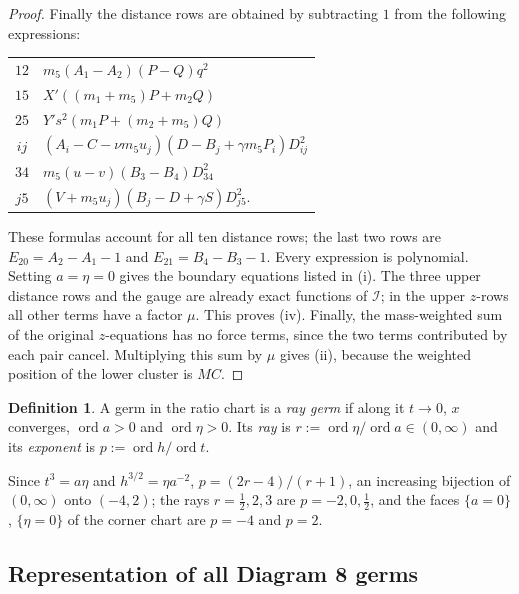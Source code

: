 \documentclass[11pt]{amsart}
\theoremstyle{definition}
\newtheorem{definition}[theorem]{Definition}
\theoremstyle{remark}
\newcommand{\ord}{\operatorname{ord}}
\begin{document}
{\begin{proof}
Finally the distance rows are obtained by subtracting $1$ from the
following expressions:
\begin{center}
\begin{tabular}{c l}
$12$ & $m_5(A_1-A_2)(P-Q)q^2$\\
$15$ & $X'((m_1+m_5)P+m_2Q)$\\
$25$ & $Y's^2(m_1P+(m_2+m_5)Q)$\\
$ij$ & $(A_i-C-\nu m_5u_j)(D-B_j+\gamma m_5P_i)D_{ij}^2$\\
$34$ & $m_5(u-v)(B_3-B_4)D_{34}^2$\\
$j5$ & $(V+m_5u_j)(B_j-D+\gamma S)D_{j5}^2$.
\end{tabular}
\end{center}
These formulas account for all ten distance rows; the last two rows are
$E_{20}=A_2-A_1-1$ and $E_{21}=B_4-B_3-1$.
Every expression is polynomial.  Setting $a=\eta=0$ gives the boundary
equations listed in (i).
The three upper distance rows and the gauge are already exact functions
of $\mathcal I$; in the upper $z$-rows all other terms have a factor $\mu$.
This proves (iv).  Finally, the mass-weighted sum of the original $z$-equations
has no force terms, since the two terms contributed by each pair cancel.
Multiplying this sum by $\mu$ gives (ii), because the weighted position of
the lower cluster is $MC$.
\end{proof}

}\begin{definition}\label{def:d8-ray}
A germ in the ratio chart is a \emph{ray germ} if along it $t\to0$, $x$ converges, $\ord a>0$
and $\ord\eta>0$.  Its \emph{ray} is $r:=\ord\eta/\ord a\in(0,\infty)$ and its \emph{exponent}
is $p:=\ord h/\ord t$.
\end{definition}
Since $t^3=a\eta$ and $h^{3/2}=\eta a^{-2}$, $p=(2r-4)/(r+1)$, an increasing bijection of
$(0,\infty)$ onto $(-4,2)$; the rays $r=\frac12,2,3$ are $p=-2,0,\frac12$, and the faces
$\{a=0\}$, $\{\eta=0\}$ of the corner chart are $p=-4$ and $p=2$.

\subsection{Representation of all Diagram 8 germs}
\end{document}

